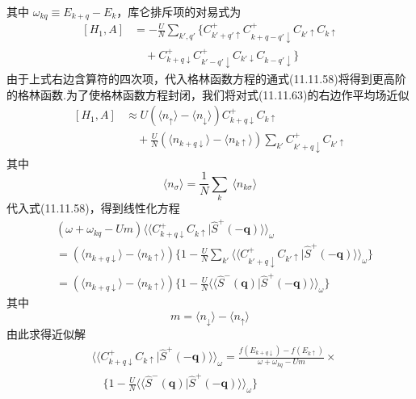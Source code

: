 其中 $\omega_{kq}\equiv E_{k+q}-E_{k}$，库仑排斥项的对易式为
\begin{equation}
\begin{aligned}
  {}[H_{1},A]&=-\frac{U}{N}\sum_{k',q'}\bigl\{C_{k'+q'\uparrow}^{+}C_{k+q-q'\downarrow}^{+}C_{k'\uparrow}C_{k\uparrow}\\
  &\quad+C_{k+q\downarrow}^{+}C_{k'-q'\downarrow}^{+}C_{k'\downarrow}C_{k-q'\downarrow}\bigr\}
\end{aligned}
\end{equation}
由于上式右边含算符的四次项，代入格林函数方程的通式(11.11.58)将得到更高阶的格林函数.为了使格林函数方程封闭，我们将对式(11.11.63)的右边作平均场近似
\begin{equation}
\begin{aligned}
  {}[H_{1},A]&\approx U(\langle n_{\uparrow}\rangle-\langle n_{\downarrow}\rangle)C_{k+q\downarrow}^{+}C_{k\uparrow}\\
  &\quad+\frac{U}{N}(\langle n_{k+q\downarrow}\rangle-\langle n_{k\uparrow}\rangle)\sum_{k'}C_{k'+q\downarrow}^{+}C_{k'\uparrow}
\end{aligned}
\end{equation}
其中
\begin{equation*}
  \langle n_{\sigma}\rangle=\frac{1}{N}\sum_{k}\ \langle n_{k\sigma}\rangle
\end{equation*}
代入式(11.11.58)，得到线性化方程
\begin{equation}
\begin{aligned}
  &(\omega+\omega_{kq}-Um)\langle\langle C_{k+q\downarrow}^{+}C_{k\uparrow}|\hat{S}^{+}(-\boldsymbol{q})\rangle\rangle_{\omega}\\
  &=(\langle n_{k+q\downarrow}\rangle-\langle n_{k\uparrow}\rangle)
  \biggl\{1-\frac{U}{N}\sum_{k'}\langle\langle C_{k'+q\downarrow}^{+}C_{k'\uparrow}|\hat{S}^{+}(-\boldsymbol{q})\rangle\rangle_{\omega}\biggr\}\\
  &=(\langle n_{k+q\downarrow}\rangle-\langle n_{k\uparrow}\rangle)
  \biggl\{1-\frac{U}{N}\langle\langle\hat{S}^{-}(\boldsymbol{q})|\hat{S}^{+}(-\boldsymbol{q})\rangle\rangle_{\omega}\biggr\}
\end{aligned}
\end{equation}
其中
\begin{equation*}
  m=\langle n_{\downarrow}\rangle-\langle n_{\uparrow}\rangle
\end{equation*}
由此求得近似解
\begin{equation}
\begin{aligned}
  &\langle\langle C_{k+q\downarrow}^{+}C_{k\uparrow}|\hat{S}^{+}(-\boldsymbol{q})\rangle\rangle_{\omega}
  =\frac{f(E_{k+q\downarrow})-f(E_{k\uparrow})}{\omega+\omega_{kq}-Um}\times\\
  &\quad\biggl\{1-\frac{U}{N}\langle\langle\hat{S}^{-}(\boldsymbol{q})|\hat{S}^{+}(-\boldsymbol{q})\rangle\rangle_{\omega}\biggr\}
\end{aligned}
\end{equation}

